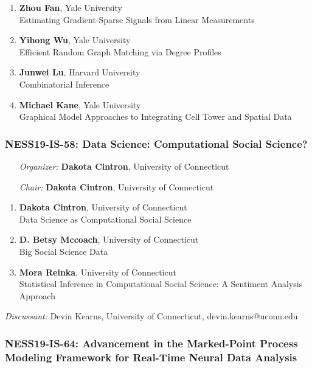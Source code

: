 \begin{enumerate}
\item \textbf{Zhou Fan}, Yale University \\
Estimating Gradient-Sparse Signals from Linear Measurements
\item \textbf{Yihong Wu}, Yale University \\
Efficient Random Graph Matching via Degree Profiles
\item \textbf{Junwei Lu}, Harvard University \\
Combinatorial Inference
\item \textbf{Michael Kane}, Yale University \\
Graphical Model Approaches to Integrating Cell Tower and Spatial Data
\end{enumerate}

\subsubsection*{NESS19-IS-58: Data Science: Computational Social Science?}

\begin{enumerate}[align=left]
\item [\emph{Organizer:}] \textbf{Dakota Cintron}, University of Connecticut
\item [\emph{Chair:}] \textbf{Dakota Cintron}, University of Connecticut
\end{enumerate}

\begin{enumerate}
\item \textbf{Dakota Cintron}, University of Connecticut \\
Data Science as Computational Social Science
\item \textbf{D. Betsy Mccoach}, University of Connecticut \\
Big Social Science Data
\item \textbf{Mora Reinka}, University of Connecticut \\
Statistical Inference in Computational Social Science: A Sentiment Analysis Approach
\end{enumerate}

\emph{Discussant:} Devin Kearns, University of Connecticut, devin.kearns@uconn.edu

\subsubsection*{NESS19-IS-64: Advancement in the Marked-Point Process Modeling Framework for Real-Time Neural Data Analysis}

